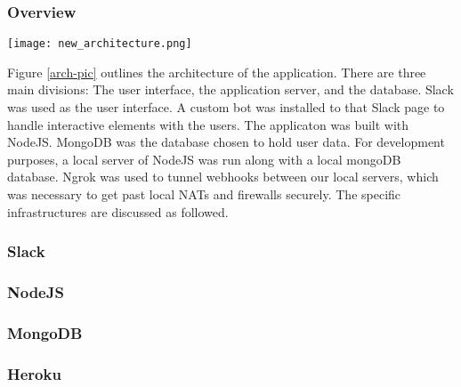 \subsubsection{Overview}
\begin{figure*}[ht]
\label{arch-pic}
\centering
\texttt{[image: new\_architecture.png]}
\end{figure*}

Figure \ref{arch-pic} outlines the architecture of the application.
There are three main divisions: The user interface, the application server, and the database. 
Slack was used as the user interface. A custom bot was installed to that Slack page to handle 
interactive elements with the users. The applicaton was built with NodeJS. MongoDB was the 
database chosen to hold user data. For development purposes, a local server of NodeJS was run 
along with a local mongoDB database. Ngrok was used to tunnel webhooks between our local servers, 
which was necessary to get past local NATs and firewalls securely. The specific infrastructures are discussed as followed.


\subsubsection{Slack}
\label{sec:slack}


\subsubsection{NodeJS}
\label{sec:nodejs}


\subsubsection{MongoDB}
\label{sec:mongo}


\subsubsection{Heroku}
\label{sec:heroku}







